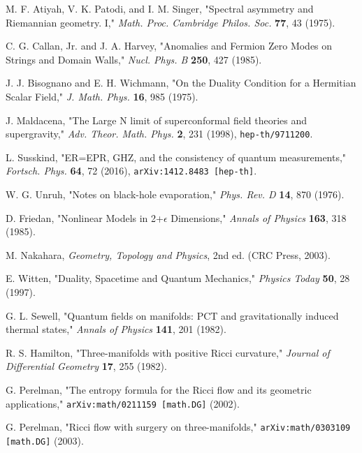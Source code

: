 \documentclass[11pt, letterpaper]{report}
\theoremstyle{plain} %
\theoremstyle{definition} %
\theoremstyle{remark} %
\begin{document}
\begin{thebibliography}{99} %

M. F. Atiyah, V. K. Patodi, and I. M. Singer, "Spectral asymmetry and Riemannian geometry. I," \textit{Math. Proc. Cambridge Philos. Soc.} \textbf{77}, 43 (1975).

C. G. Callan, Jr. and J. A. Harvey, "Anomalies and Fermion Zero Modes on Strings and Domain Walls," \textit{Nucl. Phys. B} \textbf{250}, 427 (1985).

J. J. Bisognano and E. H. Wichmann, "On the Duality Condition for a Hermitian Scalar Field," \textit{J. Math. Phys.} \textbf{16}, 985 (1975).

J. Maldacena, "The Large N limit of superconformal field theories and supergravity," \textit{Adv. Theor. Math. Phys.} \textbf{2}, 231 (1998), \texttt{hep-th/9711200}.

L. Susskind, "ER=EPR, GHZ, and the consistency of quantum measurements," \textit{Fortsch. Phys.} \textbf{64}, 72 (2016), \texttt{arXiv:1412.8483 [hep-th]}.

W. G. Unruh, "Notes on black-hole evaporation," \textit{Phys. Rev. D} \textbf{14}, 870 (1976).

D. Friedan, "Nonlinear Models in 2+$\epsilon$ Dimensions," \textit{Annals of Physics} \textbf{163}, 318 (1985).

M. Nakahara, \textit{Geometry, Topology and Physics}, 2nd ed. (CRC Press, 2003).

E. Witten, "Duality, Spacetime and Quantum Mechanics," \textit{Physics Today} \textbf{50}, 28 (1997).

G. L. Sewell, "Quantum fields on manifolds: PCT and gravitationally induced thermal states," \textit{Annals of Physics} \textbf{141}, 201 (1982).

R. S. Hamilton, "Three-manifolds with positive Ricci curvature," \textit{Journal of Differential Geometry} \textbf{17}, 255 (1982).

G. Perelman, "The entropy formula for the Ricci flow and its geometric applications," \texttt{arXiv:math/0211159 [math.DG]} (2002).

G. Perelman, "Ricci flow with surgery on three-manifolds," \texttt{arXiv:math/0303109 [math.DG]} (2003).


\end{thebibliography}
\end{document}
